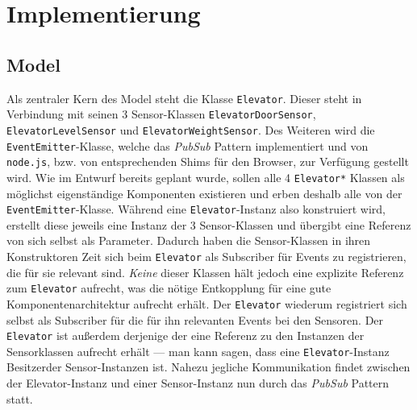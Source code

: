 \chapter{Implementierung}
\label{imp}

\section{Model}
\label{imp_model}
Als zentraler Kern des Model steht die Klasse \texttt{Elevator}.
Dieser steht in Verbindung mit seinen 3 Sensor-Klassen \texttt{ElevatorDoorSensor}, \texttt{ElevatorLevelSensor} und \texttt{ElevatorWeightSensor}.
Des Weiteren wird die \texttt{EventEmitter}-Klasse, welche das \textit{PubSub} Pattern implementiert und von \texttt{node.js}, bzw. von entsprechenden Shims für den Browser, zur Verfügung gestellt wird.
Wie im Entwurf bereits geplant wurde, sollen alle 4 \texttt{Elevator*} Klassen als möglichst eigenständige Komponenten existieren und erben deshalb alle von der \texttt{EventEmitter}-Klasse.
Während eine \texttt{Elevator}-Instanz also konstruiert wird, erstellt diese jeweils eine Instanz der 3 Sensor-Klassen und übergibt eine Referenz von sich selbst als Parameter.
Dadurch haben die Sensor-Klassen in ihren Konstruktoren Zeit sich beim \texttt{Elevator} als Subscriber für Events zu registrieren, die für sie relevant sind.
\textit{Keine} dieser Klassen hält jedoch eine explizite Referenz zum \texttt{Elevator} aufrecht, was die nötige Entkopplung für eine gute Komponentenarchitektur aufrecht erhält.
Der \texttt{Elevator} wiederum registriert sich selbst als Subscriber für die für ihn relevanten Events bei den Sensoren.
Der \texttt{Elevator} ist außerdem derjenige der eine Referenz zu den Instanzen der Sensorklassen aufrecht erhält --- man kann sagen, dass eine \texttt{Elevator}-Instanz \glqq Besitzer\grqq der Sensor-Instanzen ist.
Nahezu jegliche Kommunikation findet zwischen der Elevator-Instanz und einer Sensor-Instanz nun durch das \textit{PubSub} Pattern statt. \\


